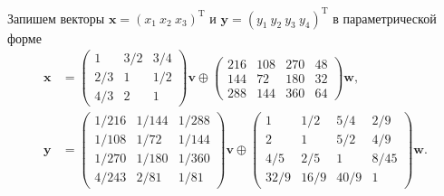 \documentclass[specialist,
               substylefile = spbu.rtx,
               subf,href,colorlinks=true, 12pt]{disser}
\DeclareMathOperator{\T}{T}
\theoremstyle{definition}
\begin{document}
Запишем векторы $\bm{x}=(x_{1}~x_{2}~x_{3})^{\T}$ и $\bm{y}=(y_{1}~y_{2}~y_{3}~y_{4})^{\T}$ в параметрической форме 
\begin{align*}
\bm{x}
&=
\begin{pmatrix}
 1 & 3/2 & 3/4
\\
 2/3 & 1 & 1/2
\\
 4/3 & 2 & 1
\end{pmatrix}
\bm{v}
\oplus
\begin{pmatrix}
 216 & 108 & 270 & 48
\\
 144 & 72 & 180 & 32
\\
 288 & 144 & 360 & 64
\end{pmatrix}
\bm{w},
\\
\bm{y}
&=
\begin{pmatrix}
 1/216 & 1/144 & 1/288
\\
 1/108 & 1/72 & 1/144
\\
 1/270 & 1/180 & 1/360
\\
 4/243 & 2/81 & 1/81
\end{pmatrix}
\bm{v}
\oplus
\begin{pmatrix}
 1 & 1/2 & 5/4 & 2/9
\\
 2 & 1 & 5/2 & 4/9
\\
 4/5 & 2/5 & 1 & 8/45
\\
 32/9 & 16/9 & 40/9 & 1
\end{pmatrix}
\bm{w}.
\end{align*}
\end{document}
